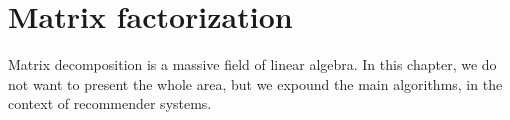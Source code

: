 
\chapter{Matrix factorization}
Matrix decomposition is a massive field of linear algebra. In this chapter, we do
not want to present the whole area, but we expound the main algorithms, in the
context of recommender systems.
